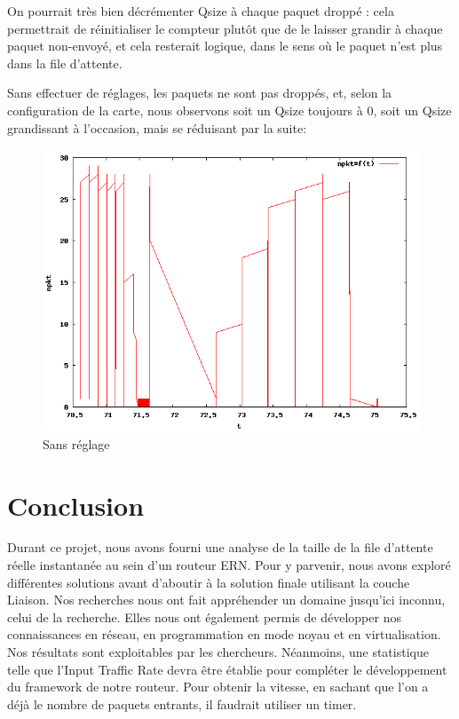 \documentclass[a4paper]{article}
\begin{document}
On pourrait très bien décrémenter Qsize à chaque paquet droppé : cela
permettrait de réinitialiser le compteur plutôt que de le laisser
grandir à chaque paquet non-envoyé, et cela resterait logique, dans le
sens où le paquet n'est plus dans la file d'attente.

Sans effectuer de  réglages, les paquets ne sont pas droppés, et, selon
la configuration de la carte, nous observons soit un
Qsize toujours à 0, soit un Qsize grandissant à l'occasion, mais se
réduisant par la suite:
\begin{figure}[!ht]
	\centering
	\includegraphics[scale=.5]{npkt_f_t.png}
	\caption{\label{qsize_default} Sans réglage}
\end{figure}

\section{Conclusion}
Durant ce projet, nous avons fourni une analyse de la taille de la file d'attente
réelle instantanée au sein d'un routeur ERN. Pour y parvenir, nous avons exploré 
différentes solutions avant d'aboutir à la solution finale utilisant la couche Liaison. 
Nos recherches nous ont fait appréhender un domaine jusqu'ici inconnu,
celui de la recherche. Elles nous ont également permis de développer nos connaissances
en réseau, en programmation en mode noyau et en virtualisation. 
Nos résultats sont exploitables par les chercheurs. Néanmoins, une statistique telle que
l'Input Traffic Rate devra être établie pour compléter le développement du framework
de notre routeur. Pour obtenir la vitesse, en sachant que l'on a déjà le nombre
de paquets entrants, il faudrait utiliser un timer.
\end{document}
